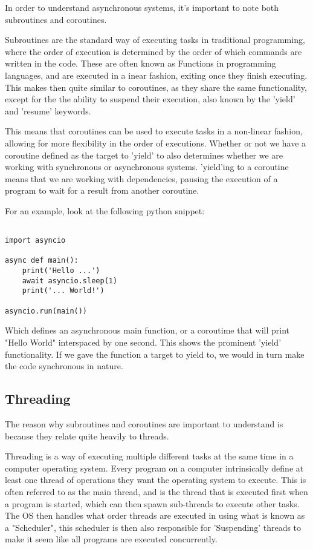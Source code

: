 \documentclass{article}
\begin{document}
In order to understand asynchronous systems, it's important to note both subroutines and coroutines. 

Subroutines are the standard way of executing tasks in traditional programming, where the order of execution is determined by the order of which commands are written in the code. These are often known as Functions in programming languages, and are executed in a inear fashion, exiting once they finish executing. This makes then quite similar to coroutines, as they share the same functionality, except for the the ability to suspend their execution, also known by the 'yield' and 'resume' keywords. 

This means that coroutines can be used to execute tasks in a non-linear fashion, allowing for more flexibility in the order of executions. Whether or not we have a coroutine defined as the target to 'yield' to also determines whether we are working with synchronous or asynchronous systems. 'yield'ing to a coroutine means that we are working with dependencies, pausing the execution of a program to wait for a result from another coroutine. 

For an example, look at the following python snippet:
\begin{verbatim}

import asyncio

async def main():
    print('Hello ...')
    await asyncio.sleep(1)
    print('... World!')

asyncio.run(main())
\end{verbatim}

Which defines an asynchronous main function, or a coroutime that will print "Hello World" interspaced by one second. This shows the prominent 'yield' functionality. If we gave the function a target to yield to, we would in turn make the code synchronous in nature.

\subsection{Threading}

The reason why subroutines and coroutines are important to understand is because they relate quite heavily to threads. 

Threading is a way of executing multiple different tasks at the same time in a computer operating system. Every program on a computer intrinsically define at least one thread of operations they want the operating system to execute. This is often referred to as the main thread, and is the thread that is executed first when a program is started, which can then spawn sub-threads to execute other tasks. The OS then handles what order threads are executed in using what is known as a "Scheduler", this scheduler is then also responsible for 'Suspending' threads to make it seem like all programs are executed concurrently. 
\end{document}
